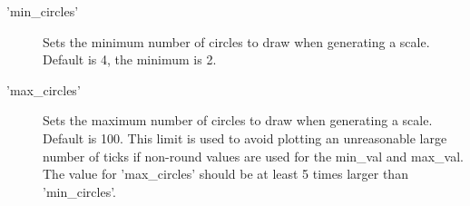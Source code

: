 \begin{description}
\item['min\_circles'] Sets the minimum number of circles to draw when generating a scale. 
                      Default is 4, the minimum is 2.

\item['max\_circles'] Sets the maximum number of circles to draw when generating a scale. 
                      Default is 100. 
                      This limit is used to avoid plotting an unreasonable large number of ticks 
                      if non-round values are used for the min\_val and max\_val.\\
                      The value for 'max\_circles' should be at least 5 times 
                      larger than 'min\_circles'.
\end{description}